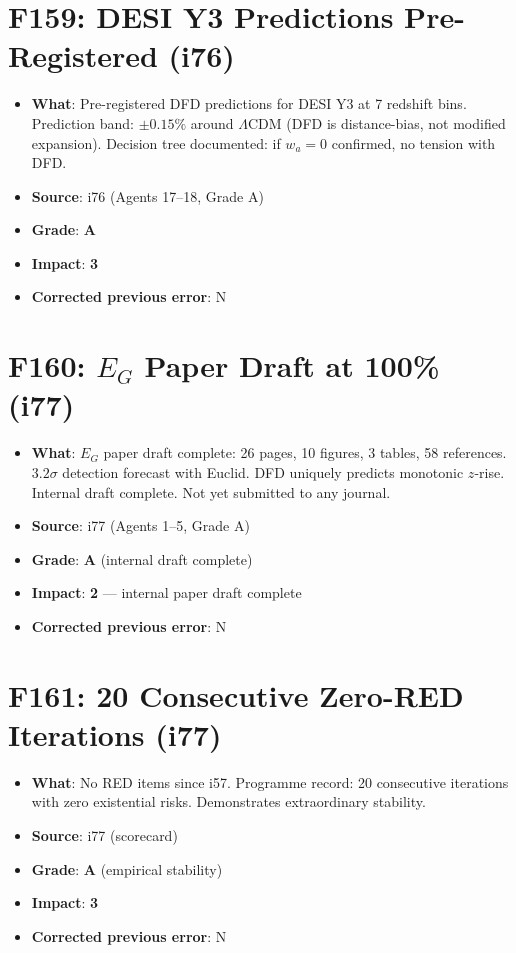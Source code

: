 \documentclass[11pt,a4paper]{article}
\newcommand{\grade}[1]{\textbf{#1}}
\newcommand{\impact}[1]{\textbf{#1}}
\begin{document}
\section{F159: DESI Y3 Predictions Pre-Registered (i76)}
\begin{itemize}[nosep]
\item \textbf{What}: Pre-registered DFD predictions for DESI Y3 at 7 redshift bins. Prediction band: $\pm 0.15\%$ around $\Lambda$CDM (DFD is distance-bias, not modified expansion). Decision tree documented: if $w_a = 0$ confirmed, no tension with DFD.
\item \textbf{Source}: i76 (Agents 17--18, Grade A)
\item \textbf{Grade}: \grade{A}
\item \textbf{Impact}: \impact{3}
\item \textbf{Corrected previous error}: N
\end{itemize}

\section{F160: $E_G$ Paper Draft at 100\% (i77)}
\begin{itemize}[nosep]
\item \textbf{What}: $E_G$ paper draft complete: 26 pages, 10 figures, 3 tables, 58 references. $3.2\sigma$ detection forecast with Euclid. DFD uniquely predicts monotonic $z$-rise. Internal draft complete. Not yet submitted to any journal.
\item \textbf{Source}: i77 (Agents 1--5, Grade A)
\item \textbf{Grade}: \grade{A} (internal draft complete)
\item \textbf{Impact}: \impact{2} --- internal paper draft complete
\item \textbf{Corrected previous error}: N
\end{itemize}

\section{F161: 20 Consecutive Zero-RED Iterations (i77)}
\begin{itemize}[nosep]
\item \textbf{What}: No RED items since i57. Programme record: 20 consecutive iterations with zero existential risks. Demonstrates extraordinary stability.
\item \textbf{Source}: i77 (scorecard)
\item \textbf{Grade}: \grade{A} (empirical stability)
\item \textbf{Impact}: \impact{3}
\item \textbf{Corrected previous error}: N
\end{itemize}
\end{document}
